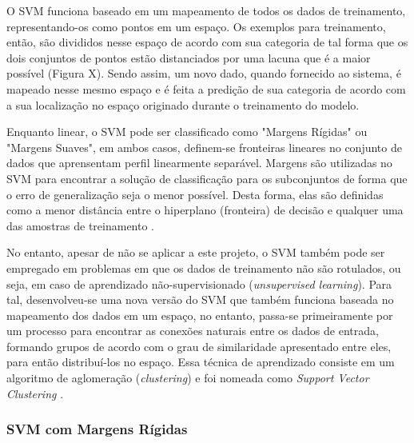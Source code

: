 O SVM funciona baseado em um mapeamento de todos os dados de treinamento, representando-os como pontos em um espaço. Os exemplos para treinamento, então, são divididos nesse espaço de acordo com sua categoria de tal forma que os dois conjuntos de pontos estão distanciados por uma lacuna que é a maior possível (Figura X). Sendo assim, um novo dado, quando fornecido ao sistema, é mapeado nesse mesmo espaço e é feita a predição de sua categoria de acordo com a sua localização no espaço originado durante o treinamento do modelo.


Enquanto linear, o SVM pode ser classificado como "Margens Rígidas" ou "Margens Suaves", em ambos casos, definem-se fronteiras lineares no conjunto de dados que aprensentam perfil linearmente separável. Margens são utilizadas no SVM para encontrar a solução de classificação para os subconjuntos de forma que o erro de generalização seja o menor possível. Desta forma, elas são definidas como a menor distância entre o hiperplano (fronteira) de decisão e qualquer uma das amostras de treinamento .

No entanto, apesar de não se aplicar a este projeto, o SVM também pode ser empregado em problemas em que os dados de treinamento não são rotulados, ou seja, em caso de aprendizado não-supervisionado (\textit{unsupervised learning}). Para tal, desenvolveu-se uma nova versão do SVM que também funciona baseada no mapeamento dos dados em um espaço, no entanto, passa-se primeiramente por um processo para encontrar as conexões naturais entre os dados de entrada, formando grupos de acordo com o grau de similaridade apresentado entre eles, para então distribuí-los no espaço. Essa técnica de aprendizado consiste em um algoritmo de aglomeração (\textit{clustering}) e foi nomeada como \textit{Support Vector Clustering} .

\subsubsection{SVM com Margens Rígidas}

